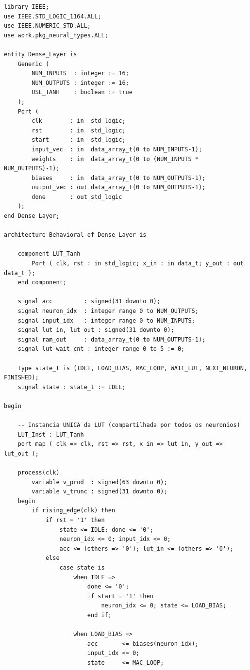 \documentclass[a4paper,12pt]{article}
\begin{document}
\begin{lstlisting}[style=vhdlstyle,
    caption={C\'odigo VHDL do \texttt{Dense\_Layer}.},
    label={lst:dense}]
library IEEE;
use IEEE.STD_LOGIC_1164.ALL;
use IEEE.NUMERIC_STD.ALL;
use work.pkg_neural_types.ALL;

entity Dense_Layer is
    Generic (
        NUM_INPUTS  : integer := 16;
        NUM_OUTPUTS : integer := 16;
        USE_TANH    : boolean := true
    );
    Port (
        clk        : in  std_logic;
        rst        : in  std_logic;
        start      : in  std_logic;
        input_vec  : in  data_array_t(0 to NUM_INPUTS-1);
        weights    : in  data_array_t(0 to (NUM_INPUTS * NUM_OUTPUTS)-1);
        biases     : in  data_array_t(0 to NUM_OUTPUTS-1);
        output_vec : out data_array_t(0 to NUM_OUTPUTS-1);
        done       : out std_logic
    );
end Dense_Layer;

architecture Behavioral of Dense_Layer is

    component LUT_Tanh
        Port ( clk, rst : in std_logic; x_in : in data_t; y_out : out data_t );
    end component;

    signal acc         : signed(31 downto 0);
    signal neuron_idx  : integer range 0 to NUM_OUTPUTS;
    signal input_idx   : integer range 0 to NUM_INPUTS;
    signal lut_in, lut_out : signed(31 downto 0);
    signal ram_out     : data_array_t(0 to NUM_OUTPUTS-1);
    signal lut_wait_cnt : integer range 0 to 5 := 0;

    type state_t is (IDLE, LOAD_BIAS, MAC_LOOP, WAIT_LUT, NEXT_NEURON, FINISHED);
    signal state : state_t := IDLE;

begin

    -- Instancia UNICA da LUT (compartilhada por todos os neuronios)
    LUT_Inst : LUT_Tanh
    port map ( clk => clk, rst => rst, x_in => lut_in, y_out => lut_out );

    process(clk)
        variable v_prod  : signed(63 downto 0);
        variable v_trunc : signed(31 downto 0);
    begin
        if rising_edge(clk) then
            if rst = '1' then
                state <= IDLE; done <= '0';
                neuron_idx <= 0; input_idx <= 0;
                acc <= (others => '0'); lut_in <= (others => '0');
            else
                case state is
                    when IDLE =>
                        done <= '0';
                        if start = '1' then
                            neuron_idx <= 0; state <= LOAD_BIAS;
                        end if;

                    when LOAD_BIAS =>
                        acc       <= biases(neuron_idx);
                        input_idx <= 0;
                        state     <= MAC_LOOP;


\end{lstlisting}
\end{document}
